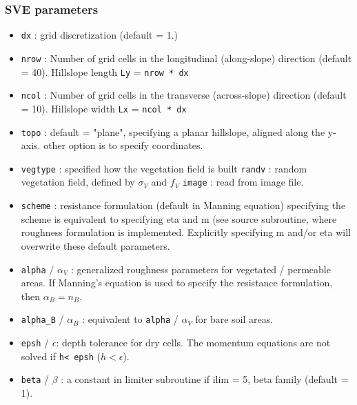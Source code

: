 \documentclass{article}
\newcommand{\code}[1]{\texttt{#1}}
\begin{document}
\subsubsection*{SVE parameters}
\begin{itemize}
	\item \code{dx} : grid discretization (default = 1.)  
	\item \code{nrow} :  Number of grid cells in the longitudinal (along-slope) direction (default = 40).
		\subitem Hillslope length \code{Ly} = \code{nrow * dx} 
	\item \code{ncol} :  Number of grid cells in the transverse (across-slope) direction (default = 10).
	 	\subitem Hillslope width \code{Lx} = \code{ncol * dx} 

	\item \code{topo} : default = "plane", specifying a planar hillslope, aligned along the y-axis.  other option is to specify coordinates.

	\item \code{vegtype} : specified how the vegetation field is built
		\subitem \code{randv} : random vegetation field, defined by $\sigma_V$ and $f_V$
	\subitem \code{image} : read from image file.
		
	\item \code{scheme} : resistance formulation (default in Manning equation)
		\subitem specifying the scheme is equivalent to specifying eta and m (see source subroutine, where roughness formulation is implemented. Explicitly specifying m and/or eta will overwrite these default parameters. 
	\item \code{alpha} / $\alpha_V$ : generalized roughness parameters for vegetated / permeable areas. If Manning's equation is used to specify the resistance formulation, then  $\alpha_B = n_B$.
	\item \code{alpha\_B} / $\alpha_B$ : equivalent to \code{alpha} / $\alpha_V$   for bare soil areas.
	\item \code{epsh} / $\epsilon$: depth tolerance for dry cells.  The momentum equations are not solved if \code{h< epsh} ($h<\epsilon$).
	\item \code{beta} / $\beta$ : a constant in limiter subroutine if ilim = 5, beta family (default = 1).   
\end{itemize}
\end{document}
